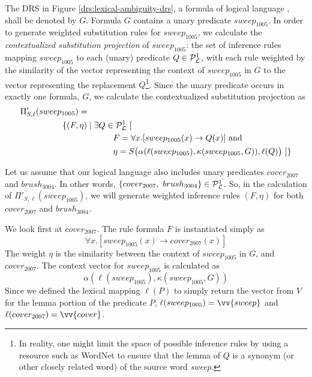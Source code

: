The DRS in Figure \ref{drs:lexical-ambiguity-drs}, a formula of logical language
\loglang, shall be denoted by $G$.  Formula $G$ contains a unary predicate
$sweep_{1005}$.  In order to generate weighted substitution rules for
$sweep_{1005}$, we calculate the {\it contextualized substitution projection} of
$sweep_{1005}$: the set of inference rules mapping $sweep_{1005}$ to each
(unary) predicate $Q \in {\cal{P}}_{{\cal{L}}}^1$, with each rule weighted by the
similarity of the vector representing the context of $sweep_{1005}$ in $G$
to the vector representing the replacement $Q$\footnote{In reality, one might
limit the space of possible inference rules by using a resource such as
WordNet to ensure that the lemma of $Q$ is a synonym (or other closely related
word) of the source word {\it sweep}.}.
Since the unary predicate  occurs in exactly one formula, $G$, we calculate the 
contextualized substitution projection as 
\begin{align*}
&\Pi'_{S, \ell}(sweep_{1005}) = \\
& \hspace{50px} \{ (F, \eta) \mid \exists Q \in \predsym{\loglang}^1~[ \\
& \hspace{110px} F = \forall x.[sweep_{1005}(x) \to Q(x)] \text{ and } \\
& \hspace{110px} \eta = S\big(\alpha(\ell(sweep_{1005}), \kappa(sweep_{1005}, G)), \ell(Q)\big)~] \}
\end{align*}

Let us assume that our logical language \loglang also includes unary predicates
$cover_{2007}$ and $brush_{3004}$.  In other words, $\{ cover_{2007},~
brush_{3004} \} \in {\cal{P}}_{{\cal{L}}}^1$.
So, in the calculation of $\Pi'_{S, \ell}(sweep_{1005})$, we will generate
weighted inference rules $(F,\eta)$ for both $cover_{2007}$ and $brush_{3004}$.

We look first at $cover_{2007}$.  The rule formula $F$ is instantiated simply as
\[ \forall x.[sweep_{1005}(x) \to cover_{2007}(x)] \]  The weight $\eta$ is the
similarity between the context of $sweep_{1005}$ in $G$, and $cover_{2007}$.
The context vector for $sweep_{1005}$ is calculated as \[
\alpha(\ell(sweep_{1005}), \kappa(sweep_{1005}, G)) \]  Since we defined the
lexical mapping $\ell(P)$ to simply return the vector from $V$ for the lemma
portion of the predicate $P$, $\ell(sweep_{1005}) = \vv{sweep}$ and
$\ell(cover_{2007}) = \vv{cover}$.  


